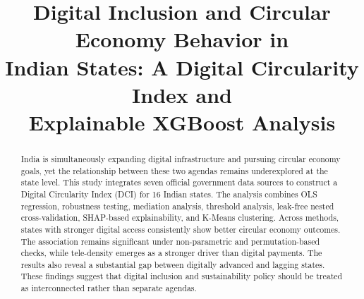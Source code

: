 \documentclass[conference]{IEEEtran}
\newif\ifblindreview
\begin{document}
\title{Digital Inclusion and Circular Economy Behavior in\\Indian States: A Digital Circularity Index and\\Explainable XGBoost Analysis}

\ifblindreview
\author{\IEEEauthorblockN{Anonymous Author(s)}
\IEEEauthorblockA{Affiliation withheld for double-blind review}}
\else
\author{
\and
{}
\and
{}
}
\fi

\maketitle

\begin{abstract}
India is simultaneously expanding digital infrastructure and pursuing circular economy goals, yet the relationship between these two agendas remains underexplored at the state level. This study integrates seven official government data sources to construct a Digital Circularity Index (DCI) for 16 Indian states. The analysis combines OLS regression, robustness testing, mediation analysis, threshold analysis, leak-free nested cross-validation, SHAP-based explainability, and K-Means clustering. Across methods, states with stronger digital access consistently show better circular economy outcomes. The association remains significant under non-parametric and permutation-based checks, while tele-density emerges as a stronger driver than digital payments. The results also reveal a substantial gap between digitally advanced and lagging states. These findings suggest that digital inclusion and sustainability policy should be treated as interconnected rather than separate agendas.
\end{abstract}
\end{document}
